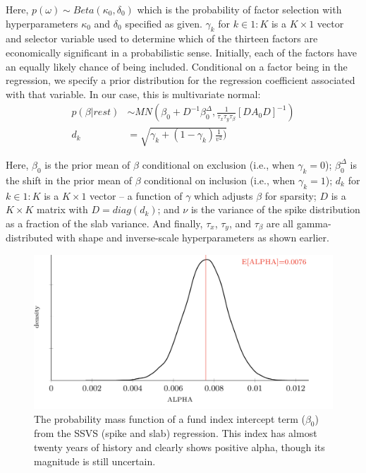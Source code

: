 \documentclass[11pt]{article}
\begin{document}
Here, $p \left( \omega \right) \sim Beta \left(\kappa_{0},\delta_{0}\right)$ which is the probability of factor selection with hyperparameters $\kappa_0$ and $\delta_0$ specified as given. $\gamma_k$ for $k \in 1:K$ is a $K \times 1$ vector and selector variable used to determine which of the thirteen factors are economically significant in a probabilistic sense. Initially, each of the factors have an equally likely chance of being included. Conditional on a factor being in the regression, we specify a prior distribution for the regression coefficient associated with that variable. In our case, this is multivariate normal:
\begin{align}
	p\left(\beta|rest\right) &\sim MN\left(\beta_{0}+D^{-1}\beta_{0}^{\Delta},\frac{1}{\tau_{x}\tau_{y}\tau_{\beta}}\left[DA_{0}D\right]^{-1}\right)	\label{eq:beta_dist}\\
	d_{k} &= \sqrt{\gamma_{k}+(1-\gamma_{k})\frac{1}{v^{2}})} \label{eq:d_k}
\end{align}

Here, $\beta_0$ is the prior mean of $\beta$ conditional on exclusion (i.e., when $\gamma_k = 0$); $\beta_0^\Delta$ is the shift in the prior mean of $\beta$ conditional on inclusion (i.e., when $\gamma_k = 1$); $d_k$ for $k \in 1:K$ is a $K \times 1$ vector -- a function of $\gamma$ which adjusts $\beta$ for sparsity; $D$ is a $K \times K$ matrix with $D = diag(d_k)$; and $\nu$ is the variance of the spike distribution as a fraction of the slab variance. And finally, $\tau_x$, $\tau_y$, and $\tau_\beta$ are all gamma-distributed with shape and inverse-scale hyperparameters as shown earlier. \\

\begin{figure}[!h]
	\centering
	\includegraphics[width=400pt]{clinton_alpha_3_preqin.png}
	\parbox{400pt}{\caption{The probability mass function of a fund index intercept term ($\beta_0$) from the SSVS (spike and slab) regression. This index has almost twenty years of history and clearly shows positive alpha, though its magnitude is still uncertain.}}
\end{figure}
\end{document}
